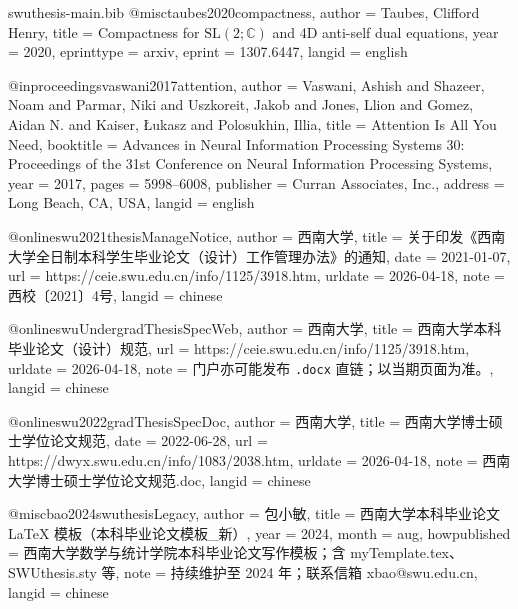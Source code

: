 \begin{filecontents*}[overwrite]{swuthesis-main.bib}
@misc{taubes2020compactness,
  author     = {Taubes, Clifford Henry},
  title      = {{Compactness for $\mathrm{SL}(2;\mathbb{C})$ and 4D anti-self dual
    equations}},
  year       = {2020},
  eprinttype = {arxiv},
  eprint     = {1307.6447},
  langid     = {english}
}

@inproceedings{vaswani2017attention,
  author    = {Vaswani, Ashish and Shazeer, Noam and Parmar, Niki and Uszkoreit, Jakob
    and Jones, Llion and Gomez, Aidan N. and Kaiser, {\L}ukasz and Polosukhin, Illia},
  title     = {Attention Is All You Need},
  booktitle = {Advances in Neural Information Processing Systems 30:
    Proceedings of the 31st Conference on Neural Information Processing Systems},
  year      = {2017},
  pages     = {5998--6008},
  publisher = {Curran Associates, Inc.},
  address   = {Long Beach, CA, USA},
  langid    = {english}
}

@online{swu2021thesisManageNotice,
  author    = {{西南大学}},
  title     = {关于印发《西南大学全日制本科学生毕业论文（设计）工作管理办法》的通知},
  date      = {2021-01-07},
  url       = {https://ceie.swu.edu.cn/info/1125/3918.htm},
  urldate   = {2026-04-18},
  note      = {西校〔2021〕4号},
  langid    = {chinese}
}

@online{swuUndergradThesisSpecWeb,
  author    = {{西南大学}},
  title     = {西南大学本科毕业论文（设计）规范},
  url       = {https://ceie.swu.edu.cn/info/1125/3918.htm},
  urldate   = {2026-04-18},
  note      = {门户亦可能发布 \texttt{.docx} 直链；以当期页面为准。},
  langid    = {chinese}
}

@online{swu2022gradThesisSpecDoc,
  author    = {{西南大学}},
  title     = {西南大学博士硕士学位论文规范},
  date      = {2022-06-28},
  url       = {https://dwyx.swu.edu.cn/info/1083/2038.htm},
  urldate   = {2026-04-18},
  note      = {西南大学博士硕士学位论文规范.doc},
  langid    = {chinese}
}

@misc{bao2024swuthesisLegacy,
  author       = {包小敏},
  title        = {西南大学本科毕业论文 {\LaTeX} 模板（本科毕业论文模板\_新）},
  year         = {2024},
  month        = aug,
  howpublished = {西南大学数学与统计学院本科毕业论文写作模板；含 myTemplate.tex、SWUthesis.sty 等},
  note         = {持续维护至 2024 年；联系信箱 xbao@swu.edu.cn},
  langid       = {chinese}
}
\end{filecontents*}

\documentclass[bachelor,punct=banjiao]{swuthesis}

\usepackage{subcaption}
\usepackage{longtable}
\usepackage{siunitx}
\usepackage{tikz}
\usetikzlibrary{arrows.meta,positioning}

